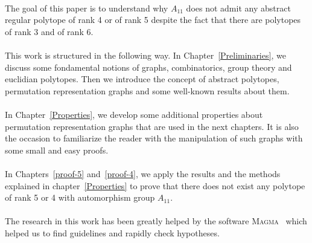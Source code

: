 \paragraph{}
The goal of this paper is to understand why $A_{11}$ does not admit any abstract regular polytope of rank 4 or of rank 5 despite the fact that there are polytopes of rank 3 and of rank 6.

\paragraph{}
This work is structured in the following way. In Chapter~\ref{Preliminaries}, we discuss some fondamental notions of graphs, combinatorics, group theory and euclidian polytopes. Then we introduce the concept of abstract polytopes, permutation representation graphs and some well-known results about them.

\paragraph{}
In Chapter~\ref{Properties}, we develop some additional properties about permutation representation graphs that are used in the next chapters. It is also the occasion to familiarize the reader with the manipulation of such graphs with some small and easy proofs.

\paragraph{}
In Chapters~\ref{proof-5} and~\ref{proof-4}, we apply the results and the methods explained in chapter~\ref{Properties} to prove that there does not exist any polytope of rank 5 or 4 with automorphism group $A_{11}$.

\paragraph{}
The research in this work has been greatly helped by the software \textsc{Magma}~\cite{magma} which helped us to find guidelines and rapidly check hypotheses.
